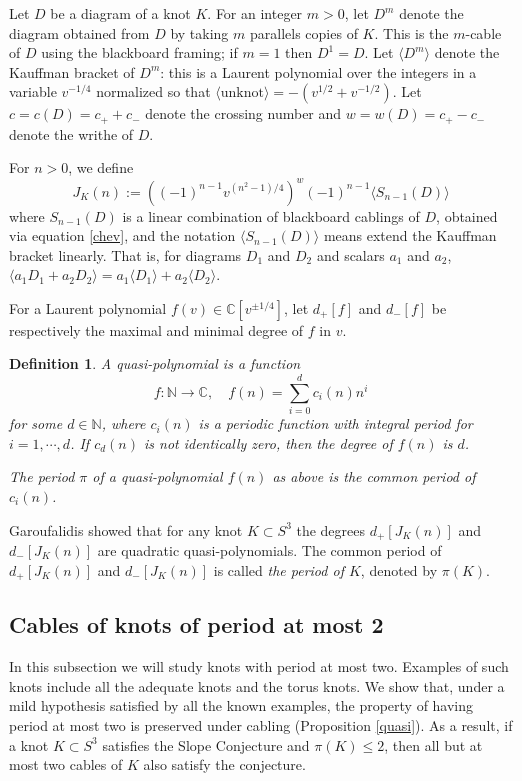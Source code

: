 \documentclass[11pt]{amsart}
\newtheorem{define}[theorem]{Definition}
\theoremstyle{definition}
\def\BC{\mathbb C}
\def\BN{\mathbb N}
\def\la{\langle}
\def\ra{\rangle}
\begin{document}
Let $D$ be a diagram of a knot $K$. For an integer $m>0$, let $D^m$ denote the diagram obtained from $D$ by taking $m$ parallels copies of $K$. This is the $m$-cable of $D$ using the blackboard framing; if $m=1$ then $D^1=D$. Let $\la D^m \ra$ denote the Kauffman bracket of $D^m$: this is a Laurent polynomial over the integers in a variable $v^{-1/4}$ normalized so that $\la \text{unknot} \ra = -(v^{1/2}+v^{-1/2})$. Let $c=c(D)=c_+ + c_-$ denote the crossing number and $w=w(D)=c_+ - c_-$ denote the writhe of $D$. 

For $n>0$, we define 
$$J_K(n):=  ( (-1)^{n-1} v^{(n^2-1)/4} )^w (-1)^{n-1}  \la S_{n-1}(D)\ra$$
where $S_{n-1}(D)$ is a linear combination of blackboard cablings of $D$, obtained via equation \eqref{chev}, and the notation $\la S_{n-1}(D) \ra$ means extend the Kauffman bracket linearly. That is, for diagrams $D_1$ and $D_2$ and scalars $a_1$ and $a_2$, $\la a_1 D_1 + a_2 D_2 \ra = a_1 \la D_1 \ra + a_2 \la D_2 \ra$.


For a Laurent polynomial $f(v) \in \BC[v^{\pm 1/4}]$, let $d_+[f]$ and $d_-[f]$ be respectively the maximal and minimal degree of $f$ in $v$.


\begin{define}
A \emph{quasi-polynomial} is a function $$f:\BN \to \BC, \quad f(n)=\sum_{i=0}^d c_i(n)n^i$$
for some $d \in \BN$, where $c_i(n)$ is a periodic function with integral period for $i=1, \cdots, d$. If $c_d(n)$ is not identically zero, then the degree of $f(n)$ is $d$. 

The \emph{period} $\pi$ of a quasi-polynomial $f(n)$ as above is the common period of $c_i(n)$.
\end{define}

Garoufalidis \cite{ga-quasi} showed that for any knot $K\subset S^3$
the degrees $ d_+[J_{K}(n)] $ and $ d_-[J_{K}(n)] $ are quadratic quasi-polynomials.
The common period  of $ d_+[J_{K}(n)] $ and $ d_-[J_{K}(n)]$ is called \emph{the period of $K$}, denoted  by $\pi(K)$. 
\medskip


\subsection{Cables of knots of period at most 2} 

\label{period_2}

In this subsection we will study knots with period at most two. Examples of such knots include all the adequate knots and the torus knots. We show that, under a mild hypothesis satisfied by all the known examples, the property of having period at most two is preserved under cabling (Proposition \ref{quasi}). As a  result, if a knot $K \subset S^3$ satisfies the Slope Conjecture and $\pi(K)\leq 2$, then all but at most two cables of $K$ also satisfy the conjecture.
\end{document}

